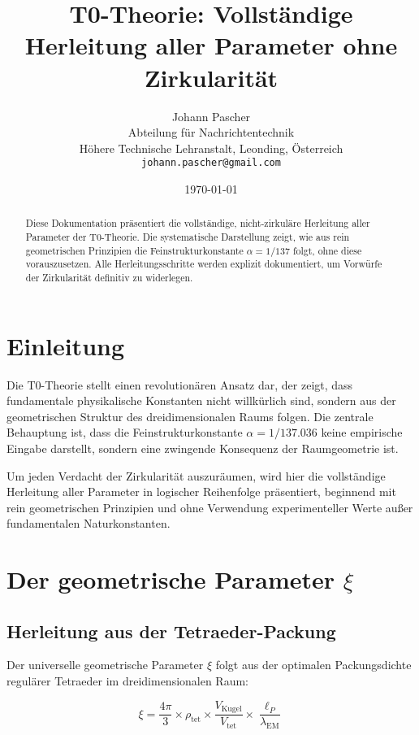 \documentclass[12pt,a4paper]{article}
\title{T0-Theorie: Vollst\"andige Herleitung aller Parameter ohne Zirkularit\"at}
\author{Johann Pascher\\
	Abteilung f\"ur Nachrichtentechnik\\
	H\"ohere Technische Lehranstalt, Leonding, \"Osterreich\\
	\texttt{johann.pascher@gmail.com}}
\date{\today}
\theoremstyle{definition}
\begin{document}
	
	\maketitle
	
	\begin{abstract}
		Diese Dokumentation pr\"asentiert die vollst\"andige, nicht-zirkul\"are Herleitung aller Parameter der T0-Theorie. Die systematische Darstellung zeigt, wie aus rein geometrischen Prinzipien die Feinstrukturkonstante $\alpha = 1/137$ folgt, ohne diese vorauszusetzen. Alle Herleitungsschritte werden explizit dokumentiert, um Vorw\"urfe der Zirkularit\"at definitiv zu widerlegen.
	\end{abstract}
	
	\section{Einleitung}
	
	Die T0-Theorie stellt einen revolution\"aren Ansatz dar, der zeigt, dass fundamentale physikalische Konstanten nicht willk\"urlich sind, sondern aus der geometrischen Struktur des dreidimensionalen Raums folgen. Die zentrale Behauptung ist, dass die Feinstrukturkonstante $\alpha = 1/137.036$ keine empirische Eingabe darstellt, sondern eine zwingende Konsequenz der Raumgeometrie ist.
	
	Um jeden Verdacht der Zirkularit\"at auszur\"aumen, wird hier die vollst\"andige Herleitung aller Parameter in logischer Reihenfolge pr\"asentiert, beginnend mit rein geometrischen Prinzipien und ohne Verwendung experimenteller Werte au\ss er fundamentalen Naturkonstanten.
\tableofcontents
\newpage	
	\section{Der geometrische Parameter $\xi$}
	
	\subsection{Herleitung aus der Tetraeder-Packung}
	
	Der universelle geometrische Parameter $\xi$ folgt aus der optimalen Packungsdichte regul\"arer Tetraeder im dreidimensionalen Raum:
	
	\begin{equation}
		\xi = \frac{4\pi}{3} \times \rho_{\text{tet}} \times \frac{V_{\text{Kugel}}}{V_{\text{tet}}} \times \frac{\ell_P}{\lambda_{\text{EM}}}
	\end{equation}
	
\end{document}
